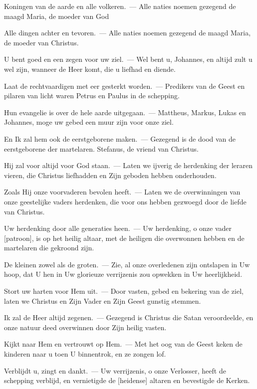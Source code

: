 \documentclass[12pt,twoside,a5paper]{article}
\begin{document}
\begin{halfparskip}

  Koningen van de aarde en alle volkeren.~--- Alle naties noemen gezegend de maagd Maria, de moeder van God

  Alle dingen achter en tevoren.~--- Alle naties noemen gezegend de maagd Maria, de moeder van Christus.

  U bent goed en een zegen voor uw ziel.~--- Wel bent u, Johannes, en altijd zult u wel zijn, wanneer de Heer komt, die u liefhad en diende.

  Laat de rechtvaardigen met eer gesterkt worden.~--- Predikers van de Geest en pilaren van licht waren Petrus en Paulus in de schepping.

  Hun evangelie is over de hele aarde uitgegaan.~--- Mattheus, Markus, Lukas en Johannes, moge uw gebed een muur zijn voor onze ziel.

  En Ik zal hem ook de eerstgeborene maken.~--- Gezegend is de dood van de eerstgeborene der martelaren. Stefanus, de vriend van Christus.

  Hij zal voor altijd voor God staan.~--- Laten we ijverig de herdenking der leraren vieren, die Christus liefhadden en Zijn geboden hebben onderhouden.

  Zoals Hij onze voorvaderen bevolen heeft.~--- Laten we de overwinningen van onze geestelijke vaders herdenken, die voor ons hebben gezwoegd door de liefde van Christus.

  Uw herdenking door alle generaties heen.~--- Uw herdenking, o onze vader [patroon], is op het heilig altaar, met de heiligen die overwonnen hebben en de martelaren die gekroond zijn.

  De kleinen zowel als de groten.~--- Zie, al onze overledenen zijn ontslapen in Uw hoop, dat U hen in Uw glorieuze verrijzenis zou opwekken in Uw heerlijkheid.

  Stort uw harten voor Hem uit.~--- Door vasten, gebed en bekering van de ziel, laten we Christus en Zijn Vader en Zijn Geest gunstig stemmen.

  Ik zal de Heer altijd zegenen.~--- Gezegend is Christus die Satan veroordeelde, en onze natuur deed overwinnen door Zijn heilig vasten.

  Kijkt naar Hem en vertrouwt op Hem.~--- Met het oog van de Geest keken de kinderen naar u toen U binnentrok, en ze zongen lof.

  Verblijdt u, zingt en dankt.~--- Uw verrijzenis, o onze Verlosser, heeft de schepping verblijd, en vernietigde de [heidense] altaren en bevestigde de Kerken.


\end{halfparskip}
\end{document}
